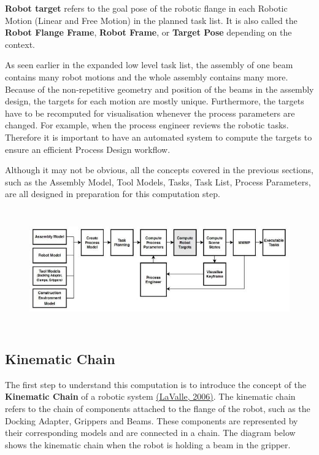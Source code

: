 \documentclass[11pt]{book}
\begin{document}
\textbf{Robot target }refers to the goal pose of the robotic flange in each Robotic Motion (Linear and Free Motion) in the planned task list. It is also called the \textbf{Robot Flange Frame}, \textbf{Robot Frame}, or \textbf{Target Pose} depending on the context. 

As seen earlier in the expanded low level task list, the assembly of one beam contains many robot motions and the whole assembly contains many more. Because of the non-repetitive geometry and position of the beams in the assembly design, the targets for each motion are mostly unique. Furthermore, the targets have to be recomputed for visualisation whenever the process parameters are changed. For example, when the process engineer reviews the robotic tasks. Therefore it is important to have an automated system to compute the targets to ensure an efficient Process Design workflow.

Although it may not be obvious, all the concepts covered in the previous sections, such as the Assembly Model, Tool Models, Tasks, Task List, Process Parameters, are all designed in preparation for this computation step. 

\begin{figure}[H]
\includegraphics[width=15.92cm,height=5.19cm]{./images/image30.jpeg}
\end{figure}


\vspace{1\baselineskip}
\subsection{Kinematic Chain}

The first step to understand this computation is to introduce the concept of the \textbf{Kinematic Chain} of a robotic system \href{https://www.zotero.org/google-docs/?LgUOmG}{(LaValle, 2006)}. The kinematic chain refers to the chain of components attached to the flange of the robot, such as the Docking Adapter, Grippers and Beams. These components are represented by their corresponding models and are connected in a chain. The diagram below shows the kinematic chain when the robot is holding a beam in the gripper. 
\end{document}
